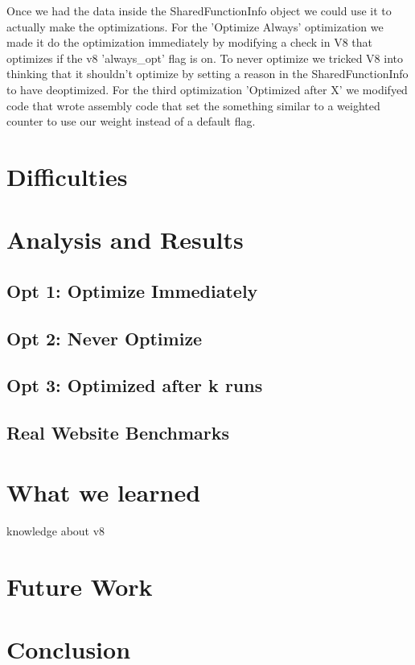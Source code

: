 \documentclass[twocolumn,showpacs,%
  nofootinbib,aps,superscriptaddress,%
  eqsecnum,prd,notitlepage,showkeys,10pt]{revtex4-1}
\begin{document}
Once we had the data inside the SharedFunctionInfo object we could use it to actually make the optimizations. For the 'Optimize Always' optimization we made it do the optimization immediately by modifying a check in V8 that optimizes if the v8 'always\_opt' flag is on. To never optimize we tricked V8 into thinking that it shouldn't optimize by setting a reason in the SharedFunctionInfo to have deoptimized. For the third optimization 'Optimized after X' we modifyed code that wrote assembly code that set the something similar to a weighted counter to use our weight instead of a default flag.

\section {Difficulties}



\section{Analysis and Results}

\subsection{Opt 1: Optimize Immediately}
\subsection{Opt 2: Never Optimize}
\subsection{Opt 3: Optimized after k runs}

\subsection{Real Website Benchmarks}


\section {What we learned}
knowledge about v8

\section{Future Work}
\section{Conclusion}
\end{document}

